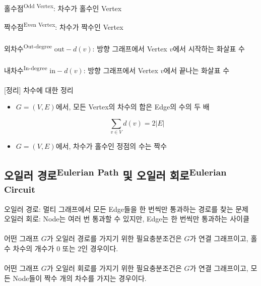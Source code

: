 홀수점\textsuperscript{Odd Vertex}: 차수가 홀수인 Vertex

짝수점\textsuperscript{Even Vertex}: 차수가 짝수인 Vertex
\\\\
외차수\textsuperscript{Out-degree} $\mathrm{out-}d(v)$: 방향 그래프에서 Vertex $v$에서 시작하는 화살표 수
\\\\
내차수\textsuperscript{In-degree} $\mathrm{in-}d(v)$: 방향 그래프에서 Vertex $v$에서 끝나는 화살표 수
\\\\\phantom{}
[정리] 차수에 대한 정리
\begin{itemize}
    \item $G = (V, E)$에서, 모든 Vertex의 차수의 합은 Edge의 수의 두 배

          $$\sum_{v \in V} d(v) = 2|E|$$
    \item $G = (V, E)$에서, 차수가 홀수인 정점의 수는 짝수
\end{itemize}

\newpage
\subsection{오일러 경로\textsuperscript{Eulerian Path} 및 오일러 회로\textsuperscript{Eulerian Circuit}}
오일러 경로: 멀티 그래프에서 모든 Edge들을 한 번씩만 통과하는 경로를 찾는 문제\\
오일러 회로: Node는 여러 번 통과할 수 있지만, Edge는 한 번씩만 통과하는 사이클\\\\
어떤 그래프 $G$가 오일러 경로를 가지기 위한 필요충분조건은 $G$가 연결 그래프이고, 홀수 차수의 개수가 $0$ 또는 $2$인 경우이다.\\\\
어떤 그래프 $G$가 오일러 회로를 가지기 위한 필요충분조건은 $G$가 연결 그래프이고, 모든 Node들이 짝수 개의 차수를 가지는 경우이다.

